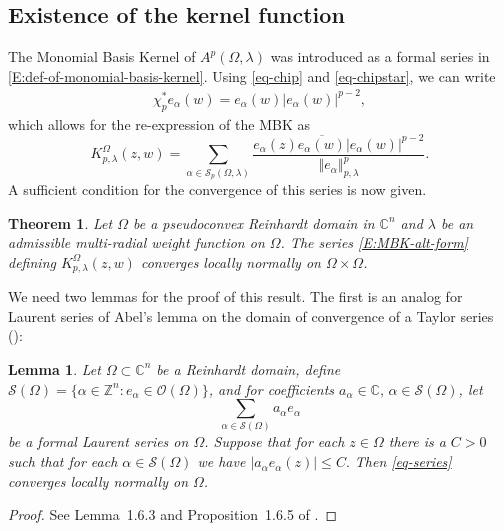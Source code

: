 \documentclass[letterpaper,11pt,reqno]{amsart}
\theoremstyle{plain}
\newtheorem{theorem}[equation]{Theorem}
\newtheorem{lemma}[equation]{Lemma}
\theoremstyle{definition}
\theoremstyle{remark}
\theoremstyle{remark}
\numberwithin{equation}{section}
\newcommand{\abs}[1]{\left\vert#1\right\vert}
\newcommand{\norm}[1]{\left\Vert#1\right\Vert}
\newcommand{\ol}{\overline}
\newcommand{\cx}{{\mathbb C}}
\newcommand{\C}{{\mathbb C}}
\newcommand{\Z}{{\mathbb Z}}
\begin{document}
\subsection{Existence of the kernel function} 
The Monomial Basis Kernel of $A^p(\Omega,\lambda)$ was introduced as a formal series in \eqref{E:def-of-monomial-basis-kernel}.
Using \eqref{eq-chip} and \eqref{eq-chipstar}, we can write
\begin{align}\label{eq-chistaralpha}
\chi_p^*e_\alpha(w) 
=e_\alpha(w)\abs{e_\alpha(w)}^{p-2},
\end{align}
which allows for the re-expression of the MBK  as
\begin{equation}\label{E:MBK-alt-form}
    K_{p,\lambda}^\Omega(z,w) =\sum_{\alpha\in \mathcal{S}_p(\Omega, \lambda) }\frac{e_\alpha(z) \ol{e_\alpha(w)}\abs{e_\alpha(w)}^{p-2}} {\norm{e_\alpha}_{p,\lambda}^p}.
\end{equation}
A sufficient condition for the convergence of this series is now given. 
\begin{theorem}\label{thm-MBK1}
Let $\Omega$ be a \emph{pseudoconvex}  Reinhardt domain in $\C^n$ and $\lambda$ be an admissible  multi-radial weight function on $\Omega$. The series \eqref{E:MBK-alt-form} defining $K^\Omega_{p,\lambda}(z,w)$ converges locally normally on  $\Omega \times \Omega$.  
\end{theorem}
We need two lemmas for the proof of this result. 
The first is an analog for Laurent series of Abel's lemma on the domain of convergence of a Taylor series (\cite[p. 14]{range}):

\begin{lemma}\label{lem-abel}
Let $\Omega\subset \cx^n$ be a Reinhardt domain, define $\mathcal{S}(\Omega) = \{\alpha\in \Z^n : e_\alpha \in \mathcal{O}(\Omega)\}$, and for coefficients $a_\alpha \in \cx,\,\alpha\in\mathcal{S}(\Omega)$, let 
\begin{equation}\label{eq-series}
\sum_{\alpha\in \mathcal{S}(\Omega)}a_\alpha e_\alpha
\end{equation}
be a formal Laurent series on $\Omega$. 
Suppose that for each $z\in \Omega$ there is a $C>0$ such that for each $\alpha\in \mathcal{S}(\Omega)$ we have $\abs{a_\alpha e_\alpha(z)}\leq C.$
Then \eqref{eq-series} converges locally normally on $\Omega$.
\end{lemma}
\begin{proof}
See Lemma~1.6.3 and Proposition~1.6.5 of \cite[Section~1.6]{JarPflBook08}.
\end{proof}
\end{document}

